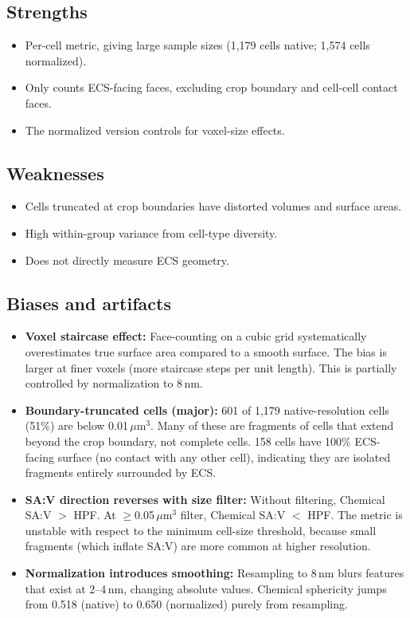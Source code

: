 \documentclass[times, twoside]{zHenriquesLab-StyleBioRxiv}
\begin{document}
\subsection*{Strengths}
\begin{itemize}[nosep]
\item Per-cell metric, giving large sample sizes (1,179 cells native; 1,574 cells normalized).
\item Only counts ECS-facing faces, excluding crop boundary and cell-cell contact faces.
\item The normalized version controls for voxel-size effects.
\end{itemize}

\subsection*{Weaknesses}
\begin{itemize}[nosep]
\item Cells truncated at crop boundaries have distorted volumes and surface areas.
\item High within-group variance from cell-type diversity.
\item Does not directly measure ECS geometry.
\end{itemize}

\subsection*{Biases and artifacts}
\begin{itemize}[nosep]
\item \textbf{Voxel staircase effect:} Face-counting on a cubic grid systematically overestimates true surface area compared to a smooth surface. The bias is larger at finer voxels (more staircase steps per unit length). This is partially controlled by normalization to 8\,nm.
\item \textbf{Boundary-truncated cells (major):} 601 of 1,179 native-resolution cells (51\%) are below 0.01\,$\mu$m$^3$. Many of these are fragments of cells that extend beyond the crop boundary, not complete cells. 158 cells have 100\% ECS-facing surface (no contact with any other cell), indicating they are isolated fragments entirely surrounded by ECS.
\item \textbf{SA:V direction reverses with size filter:} Without filtering, Chemical SA:V $>$ HPF. At $\geq$0.05\,$\mu$m$^3$ filter, Chemical SA:V $<$ HPF. The metric is unstable with respect to the minimum cell-size threshold, because small fragments (which inflate SA:V) are more common at higher resolution.
\item \textbf{Normalization introduces smoothing:} Resampling to 8\,nm blurs features that exist at 2--4\,nm, changing absolute values. Chemical sphericity jumps from 0.518 (native) to 0.650 (normalized) purely from resampling.
\end{itemize}
\end{document}
